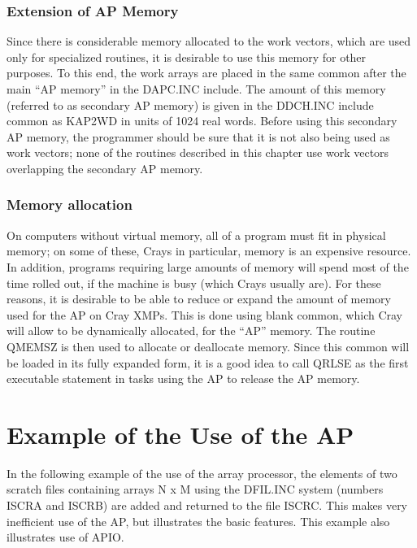 \subsubsection{Extension of AP Memory }
Since there is considerable memory allocated to the work vectors,
which are used only for specialized routines, it is desirable to use
this memory for other purposes.  To this end, the work arrays are
placed in the same common after the main ``AP memory'' in the
DAPC.INC include. The amount of this memory (referred
to as secondary AP memory) is given in the DDCH.INC include common
as KAP2WD in units of 1024 real words. Before using this secondary AP
memory, the programmer should be sure that it is not also being used
as work vectors; none of the routines described in this chapter use
work vectors overlapping the secondary AP memory.

\subsubsection{Memory allocation }
On computers without virtual memory, all of a program must fit in
physical memory; on some of these, Crays in particular, memory is
an expensive resource.  In addition, programs requiring large amounts
of memory will spend most of the time rolled out, if the machine is
busy (which Crays usually are).  For these reasons, it is desirable to
be able to reduce or expand the amount of memory used for the AP on
Cray XMPs.  This is done using blank common, which Cray will allow to
be dynamically allocated, for the ``AP'' memory.  The routine QMEMSZ is
then used to allocate or deallocate memory.  Since this common will be
loaded in its fully expanded form, it is a good idea to call QRLSE as
the first executable statement in tasks using the AP to release the AP
memory.

\section{Example of the Use of the AP }
 In the following example of the use of the array processor, the
elements of two scratch files containing arrays N x M using the
DFIL.INC system (numbers ISCRA and ISCRB) are added and returned to
the file ISCRC.  This makes very inefficient use of the AP, but
illustrates the basic features.  This example also illustrates use of
APIO.

